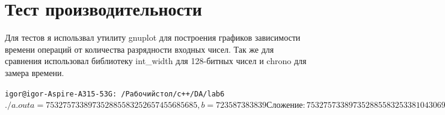 
\section{Тест производительности}

Для тестов я использвал утилиту gnuplot для построения графиков зависимости времени операций от количества разрядности входных чисел. Так же для сравнения использовал библиотеку int\_width для 128-битных чисел и chrono для замера времени.
  
\begin{alltt}
igor@igor-Aspire-A315-53G:~/Рабочий стол/c++/DA/lab6$ ./a.out
a = 753275733897352885583252657455685685, b = 723587383839

Сложение: 
753275733897352885583253381043069524
Моя реализация: 2.2498e-05
Библиотека <int_width>: 0.00179459

Вычитание: 
753275733897352885583251933868301846
Моя реализация: 4.602e-06
Библиотека <int_width>: 0.000723548

Деление: 
1041029391503263989488349
Моя реализация: 1.76e-05
Библиотека <int_width>: 0.000360422
igor@igor-Aspire-A315-53G:~/Рабочий стол/c++/DA/lab6$
\end{alltt}

